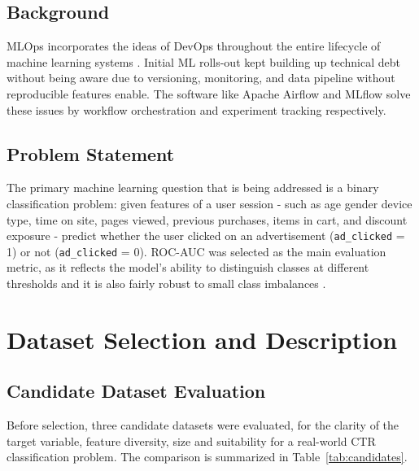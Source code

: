 \documentclass[12pt,a4paper]{article}
\begin{document}
\subsection*{Background}

MLOps incorporates the ideas of DevOps throughout the entire lifecycle of machine learning systems \cite{sculley2015}. Initial ML rolls-out kept building up technical debt without being aware due to versioning, monitoring, and data pipeline without reproducible features enable. The software like Apache Airflow \cite{airflow} and MLflow \cite{mlflow} solve these issues by workflow orchestration and experiment tracking respectively.

\subsection*{Problem Statement}

The primary machine learning question that is being addressed is a binary classification problem: given features of a user session -
such as age gender device type, time on site, pages viewed, previous purchases, items in cart, and discount exposure -
predict whether the user clicked on an advertisement (\texttt{ad\_clicked} = 1) or not (\texttt{ad\_clicked} = 0). ROC-AUC was selected as the main evaluation metric, as it reflects the model's ability to distinguish classes at different thresholds and it is also fairly robust to small class imbalances \cite{fawcett2006}.

\section{Dataset Selection and Description}

\subsection{Candidate Dataset Evaluation}

Before selection, three candidate datasets were evaluated, for the clarity of the target variable, feature diversity, size and suitability for a real-world CTR classification problem. The comparison is summarized in Table~\ref{tab:candidates}.
\end{document}
